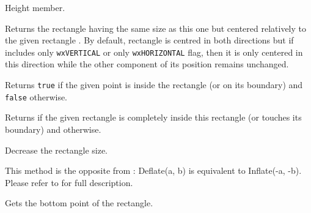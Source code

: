 
Height member.


\label{wxrectcentrein}



Returns the rectangle having the same size as this one but centered relatively
to the given rectangle . By default, rectangle is centred in both
directions but if  includes only \texttt{wxVERTICAL} or only 
\texttt{wxHORIZONTAL} flag, then it is only centered in this direction while
the other component of its position remains unchanged.


\label{wxrectcontains}



Returns {\tt true} if the given point is inside the rectangle (or on its
boundary) and {\tt false} otherwise.


Returns \true if the given rectangle is completely inside this rectangle
(or touches its boundary) and \false otherwise.


\label{wxrectdeflate}




Decrease the rectangle size.

This method is the opposite from :
Deflate(a, b) is equivalent to Inflate(-a, -b).
Please refer to  for full description.




\label{wxrectgetbottom}


Gets the bottom point of the rectangle.


